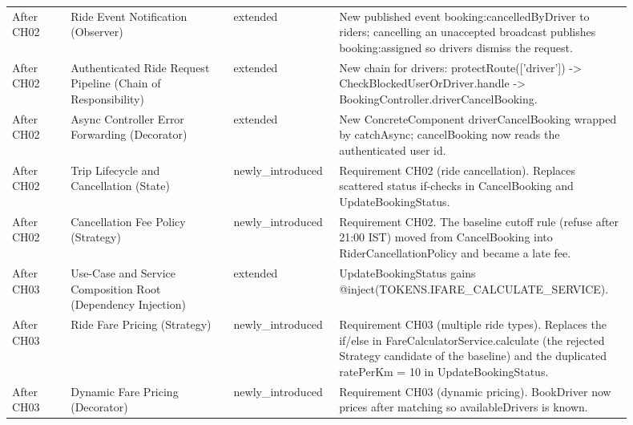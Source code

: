 \documentclass[11pt,a4paper]{article}
\begin{document}
\begin{longtable}{@{}P{0.09\linewidth}P{0.25\linewidth}P{0.16\linewidth}P{0.4\linewidth}@{}}
After CH02 & Ride Event Notification (Observer) & extended & New published event booking:cancelledByDriver to riders; cancelling an unaccepted broadcast publishes booking:assigned so drivers dismiss the request. \\
After CH02 & Authenticated Ride Request Pipeline (Chain of Responsibility) & extended & New chain for drivers: protectRoute(['driver']) -\textgreater{} CheckBlockedUserOrDriver.handle -\textgreater{} BookingController.driverCancelBooking. \\
After CH02 & Async Controller Error Forwarding (Decorator) & extended & New ConcreteComponent driverCancelBooking wrapped by catchAsync; cancelBooking now reads the authenticated user id. \\
After CH02 & Trip Lifecycle and Cancellation (State) & newly\_\allowbreak{}introduced & Requirement CH02 (ride cancellation). Replaces scattered status if-checks in CancelBooking and UpdateBookingStatus. \\
After CH02 & Cancellation Fee Policy (Strategy) & newly\_\allowbreak{}introduced & Requirement CH02. The baseline cutoff rule (refuse after 21:00 IST) moved from CancelBooking into RiderCancellationPolicy and became a late fee. \\
After CH03 & Use-Case and Service Composition Root (Dependency Injection) & extended & UpdateBookingStatus gains @inject(TOKENS.IFARE\_CALCULATE\_SERVICE). \\
After CH03 & Ride Fare Pricing (Strategy) & newly\_\allowbreak{}introduced & Requirement CH03 (multiple ride types). Replaces the if/else in FareCalculatorService.calculate (the rejected Strategy candidate of the baseline) and the duplicated ratePerKm = 10 in UpdateBookingStatus. \\
After CH03 & Dynamic Fare Pricing (Decorator) & newly\_\allowbreak{}introduced & Requirement CH03 (dynamic pricing). BookDriver now prices after matching so availableDrivers is known. \\
\bottomrule
\end{longtable}
\end{document}
